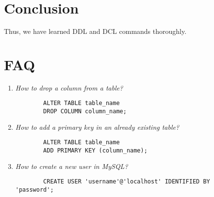 \documentclass[11pt]{article}
\begin{document}
\section{Conclusion}
Thus, we have learned DDL and DCL commands thoroughly.
\clearpage

\section{FAQ}
\begin{enumerate}
	\item \textit{How to drop a column from a table?}
	      \begin{verbatim}
		ALTER TABLE table_name
		DROP COLUMN column_name;
	\end{verbatim}

	\item \textit{How to add a primary key in an already existing table?}
	      \begin{verbatim}
		ALTER TABLE table_name
		ADD PRIMARY KEY (column_name);
	\end{verbatim}
	\item \textit{How to create a new user in MySQL?}
	      \begin{verbatim}
		CREATE USER 'username'@'localhost' IDENTIFIED BY 'password';
	\end{verbatim}
\end{enumerate}
\end{document}
